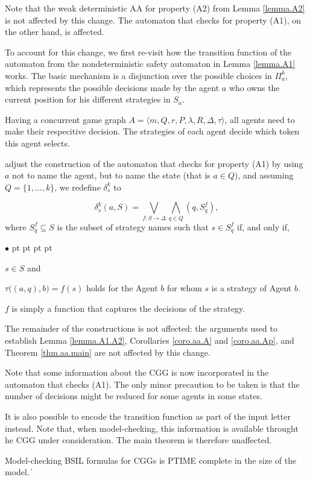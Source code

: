 \documentclass[11pt]{article}
\def\qed{\ifmmode\|\else{\unskip\nobreak\hfil
\penalty50\hskip1em\null\nobreak\hfil$\blacksquare$
\parfillskip=0pt\finalhyphendemerits=0\endgraf}\fi}
\newenvironment{list1}{\begin{list}{$\bullet$}
{\topsep 0 pt \parsep 0 pt \partopsep 0 pt \itemsep 0 pt}}{\end{list}}
\begin{document}
Note that the weak deterministic AA for property (A2) from Lemma \ref{lemma.A2} is not affected by this change. The automaton that checks for property (A1), on the other hand, is affected.

To account for this change, we first re-visit how the transition function of the automaton from the nondeterministic safety automaton in Lemma \ref{lemma.A1} works.
The basic mechanism is a disjunction over the possible choices in $\Pi^k_a$, which represents the possible decisions made by the agent $a$ who owns the current position for his different strategies in $S_a$.

Having a concurrent game graph $A=\langle m,Q,r,P,\lambda,R,\Delta,\tau\rangle$, all agents need to make their respecitive decision.
The strategies of each agent decide which token this agent selects.


adjust the construction of the automaton that checks for property (A1) by using $a$ not to name the agent, but to name the state (that is $a \in Q$), and assuming $Q = \{1,\ldots,k\}$, we redefine $\delta_s^k$ to 

$$\delta_s^k (a,S) = \bigvee_{f:S\rightarrow \Delta} \bigwedge_{q \in Q} (q,S^f_q),$$
%
where $S^f_q \subseteq S$ is the subset of strategy names such that $s \in S^f_q$ if, and only if,
\begin{list1}
\item $s \in S$ and
\item $\tau\big((a,q),b\big) = f(s)$ holds for the Agent $b$ for whom $s$ is a strategy of Agent $b$. 
\end{list1}
$f$ is simply a function that captures the decisions of the strategy.

The remainder of the constructions is not affected: the arguments used to establish Lemma \ref{lemma.A1.A2}, Corollaries \ref{coro.aa.A} and \ref{coro.aa.Ap}, and Theorem \ref{thm.aa.main} are not affected by this change.

Note that some information about the CGG is now incorporated in the automaton that checks (A1). The only minor precaution to be taken is that the number of decisions might be reduced for some agents in some states.

It is also possible to encode the transition function as part of the input letter instead.
Note that, when model-checking, this information is available throught he CGG under consideration. The main theorem is therefore unaffected.

{\theorem\label{thm.aa.cgg} 
Model-checking BSIL formulas for CGGs is PTIME complete in the size of the model.
}
\qed 
\end{document}

